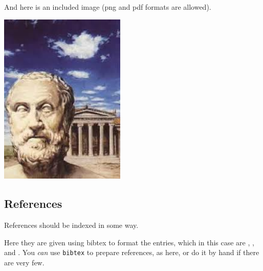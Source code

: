 \documentclass[10pt,a4paper,twocolumn]{article}
\begin{document}
And here is an included image (png and pdf formats are allowed).

\begin{center}
  \includegraphics[width=6cm]
  {carneades.png}
\end{center}
\subsection{References}

References should be indexed in some way.

Here they are given  using bibtex to format the entries, which 
in this case are
\cite{ES1}, \cite{ES2}, and \cite{ES3}. 
You \emph{can} use \texttt{bibtex} to prepare references, as here,
or do it by hand if there are very few.

%


\end{document}
